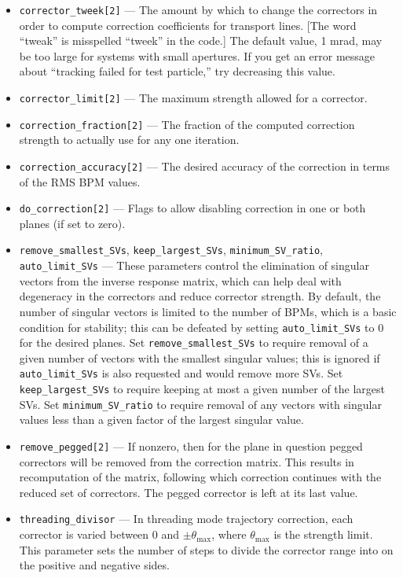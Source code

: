 \documentclass[11pt]{article}
\begin{document}
\begin{itemize}
\item \verb|corrector_tweek[2]| --- The amount by which to change the correctors in order to compute correction coefficients for
transport lines.
[The word ``tweak'' is misspelled ``tweek'' in the code.]   The default value, 1 mrad, may be too large for systems with
small apertures.  If you get an error message about ``tracking failed for test particle,'' try decreasing this value.
\item \verb|corrector_limit[2]| --- The maximum strength allowed for a corrector.
\item \verb|correction_fraction[2]| --- The fraction of the computed correction strength to actually use for any one iteration.
\item \verb|correction_accuracy[2]| --- The desired accuracy of the correction in terms of the RMS BPM values.
\item \verb|do_correction[2]| --- Flags to allow disabling correction in one or both planes (if set to zero).
\item \verb|remove_smallest_SVs|, \verb|keep_largest_SVs|, \verb|minimum_SV_ratio|, \verb|auto_limit_SVs| --- These parameters control the elimination of
  singular vectors from the inverse response matrix, which can help deal with degeneracy in the correctors and reduce corrector strength.
  By default, the number of singular vectors is limited to the number of BPMs, which is a basic condition for stability; this can be defeated by
  setting \verb|auto_limit_SVs| to 0 for the desired planes.  Set \verb|remove_smallest_SVs| to require removal of a given number of
  vectors with the smallest singular values; this is ignored if \verb|auto_limit_SVs| is also requested and would remove more SVs. 
  Set \verb|keep_largest_SVs| to require keeping at most a given number of the largest SVs.
  Set \verb|minimum_SV_ratio| to require removal of any vectors with singular values less than a given factor of the largest singular value.
\item \verb|remove_pegged[2]| --- If nonzero, then for the plane in question pegged correctors will be removed from the correction matrix.
  This results in recomputation of the matrix, following which correction continues with the reduced set of correctors.
  The pegged corrector is left at its last value.
\item \verb|threading_divisor| --- In threading mode trajectory correction, each corrector is varied between 0 and $\pm{\theta_{\textrm{max}}}$, 
  where $\theta_{\textrm{max}}$ is the strength limit.
  This parameter sets the number of steps to divide the corrector range into on the positive and negative sides.

\end{itemize}
\end{document}
